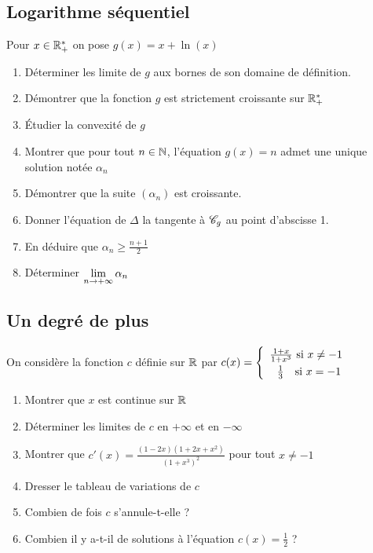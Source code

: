 \documentclass[oneside,12pt]{book}          %
\begin{document}
\subsection{Logarithme séquentiel}
Pour $x\in{\mathbb R}^*_+$ on pose $g(x)=x+\ln(x)$
\begin{enumerate}
	\item Déterminer les limite de $g$ aux bornes de son domaine de définition.
	\item Démontrer que la fonction $g$ est strictement croissante sur ${\mathbb R}^*_+$
	\item Étudier la convexité de $g$
	\item Montrer que pour tout ${n\in\mathbb N}$, l'équation $g(x)=n$ admet une unique solution notée $\alpha_n$
	\item Démontrer que la suite $(\alpha_n)$ est croissante.
	\item Donner l'équation de $\Delta$ la tangente à ${\mathscr{C}}_g$ au point d'abscisse 1.
	\item En déduire que $\alpha_n\geq\frac{n+1}{2}$
	\item Déterminer ${\lim\limits_{n\to +\infty}}\,\alpha_n$
\end{enumerate}



\subsection{Un degré de plus}
On considère la fonction $c$ définie sur ${\mathbb R}$ par $c(x)=\accolsized{\frac{1+x}{1+x^3} \text{ si } x\neq-1 \\~~ \frac{1}{3} \text{~~ si } x=-1}{1.3}$
\begin{enumerate}
	\item Montrer que $x$ est continue sur ${\mathbb R}$
    \item Déterminer les limites de $c$ en $+\infty$ et en $-\infty$
    \item Montrer que $c'(x)=\frac{(1-2x)(1+2x+x^2)}{(1+x^3)^2}$ pour tout $x\neq-1$
    \item Dresser le tableau de variations de $c$
    \item Combien de fois $c$ s'annule-t-elle ?
    \item Combien il y a-t-il de solutions à l'équation $c(x)=\frac{1}{2}$ ?
\end{enumerate}
\end{document}
